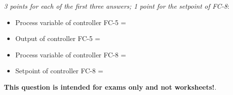 {\it 3 points for each of the first three answers; 1 point for the setpoint of FC-8}:

\begin{itemize}
\item{} Process variable of controller FC-5 = 
\item{} Output of controller FC-5 = 
\item{} Process variable of controller FC-8 = 
\item{} Setpoint of controller FC-8 = 
\end{itemize}







{\bf This question is intended for exams only and not worksheets!}.



